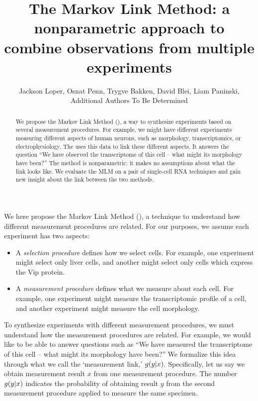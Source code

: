 \usepackage{cancel}


\title{The Markov Link Method: a nonparametric approach to combine observations from multiple experiments}
\author{Jackson Loper, Osnat Penn, Trygve Bakken, David Blei, Liam Paninski, \\Additional Authors To Be Determined}

\usepackage{amsthm}
\newtheorem{thm}{Theorem}
\newtheorem{lem}{Lemma}
\newtheorem{conj}{Conjecture}

\theoremstyle{definition}
\newtheorem{example}{Example}
\newtheorem{definition}{Definition}


\maketitle

\begin{abstract}
We propose the Markov Link Method (\MLM), a way to synthesize experiments based on several measurement procedures.  For example, we might have different experiments measuring different aspects of human neurons, such as morphology, transcriptomics, or electrophysiology.  The \MLM{} uses this data to link these different aspects.  It answers the question ``We have observed the transcriptome of this cell -- what might its morphology have been?'' The method is nonparametric: it makes no assumptions about what the link looks like.  We evaluate the MLM on a pair of single-cell RNA techniques and gain new insight about the link between the two methods.
\end{abstract}

We here propose the Markov Link Method (\MLM), a technique to understand how different measurement procedures are related.  For our purposes, we assume each experiment has two aspects:
%
\begin{itemize}
    \item A \emph{selection procedure} defines how we select cells.  For example, one experiment might select only liver cells, and another might select only cells which express the Vip protein.  
    \item A \emph{measurement procedure} defines what we measure about each cell.  For example, one experiment might measure the transcriptomic profile of a cell, and another experiment might measure the cell morphology.
\end{itemize}
%
To synthesize experiments with different measurement procedures, we must understand how the measurement procedures are related.  For example, we would like to be able to answer questions such as ``We have measured the transcriptome of this cell -- what might its morphology have been?''  We formalize this idea through what we call the `measurement link,' $g(y|x)$.  Specifically, let us say we obtain measurement result $x$ from one measurement procedure.  The number $g(y|x)$ indicates the probability of obtaining result $y$ from the second measurement procedure applied to measure the same specimen.  

